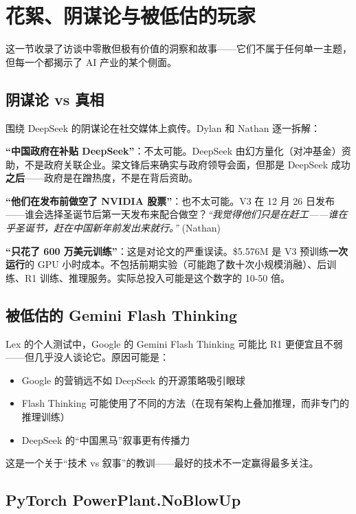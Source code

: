 \section{花絮、阴谋论与被低估的玩家}

这一节收录了访谈中零散但极有价值的洞察和故事——它们不属于任何单一主题，但每一个都揭示了 AI 产业的某个侧面。

\subsection{阴谋论 vs 真相}

围绕 DeepSeek 的阴谋论在社交媒体上疯传。Dylan 和 Nathan 逐一拆解：

\textbf{``中国政府在补贴 DeepSeek''}：不太可能。DeepSeek 由幻方量化（对冲基金）资助，不是政府关联企业。梁文锋后来确实与政府领导会面，但那是 DeepSeek 成功\textbf{之后}——政府是在蹭热度，不是在背后资助。

\textbf{``他们在发布前做空了 NVIDIA 股票''}：也不太可能。V3 在 12 月 26 日发布——谁会选择圣诞节后第一天发布来配合做空？\textit{``我觉得他们只是在赶工——谁在乎圣诞节，赶在中国新年前发出来就行。''} (Nathan)

\textbf{``只花了 600 万美元训练''}：这是对论文的严重误读。\$5.576M 是 V3 预训练\textbf{一次运行}的 GPU 小时成本。不包括前期实验（可能跑了数十次小规模消融）、后训练、R1 训练、推理服务。实际总投入可能是这个数字的 10-50 倍。

\subsection{被低估的 Gemini Flash Thinking}

Lex 的个人测试中，Google 的 Gemini Flash Thinking 可能比 R1 更便宜且不弱——但几乎没人谈论它。原因可能是：
\begin{itemize}
    \item Google 的营销远不如 DeepSeek 的开源策略吸引眼球
    \item Flash Thinking 可能使用了不同的方法（在现有架构上叠加推理，而非专门的推理训练）
    \item DeepSeek 的``中国黑马''叙事更有传播力
\end{itemize}

这是一个关于``技术 vs 叙事''的教训——最好的技术不一定赢得最多关注。

\subsection{PyTorch PowerPlant.NoBlowUp}

